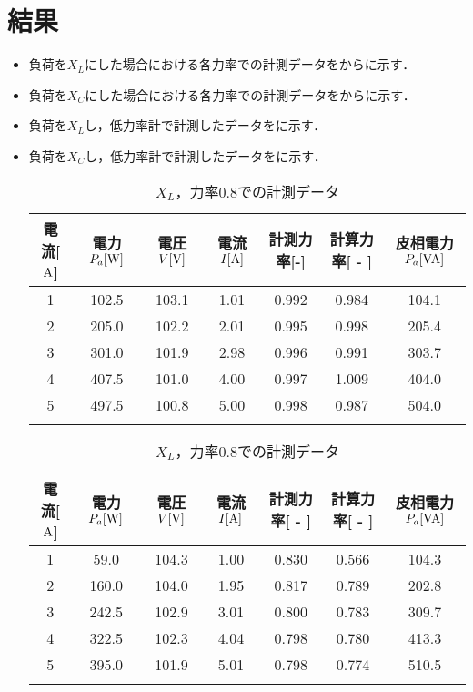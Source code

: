 \clearpage
\section{結果}
\begin{itemize}
	\item 負荷を$X_{L}$にした場合における各力率での計測データをからに示す．
	\item 負荷を$X_{C}$にした場合における各力率での計測データをからに示す．
	\item 負荷を$X_{L}$し，低力率計で計測したデータを\wtab{}に示す．
	\item 負荷を$X_{C}$し，低力率計で計測したデータを\wtab{}に示す．
\begin{table}[h]
	\centering
	\caption{$X_{L}$，力率$1.0$での計測データ}
	\label{tab:1data}
\begin{tabular}{ccccccc}
	\hline
	電流[$\rm{A}$] & 電力$P_a[\rm{W}]$ & 電圧$V[\rm{V}]$ & 電流$I[\rm{A}]$ & 計測力率[\rm{-}]  & 計算力率[ - ]  & 皮相電力$P_a[\rm{VA}]$ \\ \hline
	1      & 102.5   & 103.1   & 1.01  & 0.992 & 0.984 & 104.1   \\
	2      & 205.0   & 102.2   & 2.01  & 0.995 & 0.998 & 205.4   \\
	3      & 301.0   & 101.9   & 2.98  & 0.996 & 0.991 & 303.7   \\
	4      & 407.5   & 101.0   & 4.00  & 0.997 & 1.009 & 404.0   \\
	5      & 497.5   & 100.8   & 5.00  & 0.998 & 0.987 & 504.0     \\ \hline\\
\end{tabular}
	\caption{$X_{L}$，力率$0.8$での計測データ}
	\label{tab:0.8data}
\begin{tabular}{ccccccc}
	\hline
	電流[$\rm{A}$] & 電力$P_a[\rm{W}]$ & 電圧$V[\rm{V}]$ & 電流$I[\rm{A}]$ & 計測力率[ - ] & 計算力率[ - ] & 皮相電力$P_a[\rm{VA}]$ \\ \hline
	1 & 59.0  & 104.3 & 1.00 & 0.830 & 0.566 & 104.3 \\
	2 & 160.0 & 104.0 & 1.95 & 0.817 & 0.789 & 202.8 \\
	3 & 242.5 & 102.9 & 3.01 & 0.800 & 0.783 & 309.7 \\
	4 & 322.5 & 102.3 & 4.04 & 0.798 & 0.780 & 413.3 \\
	5 & 395.0 & 101.9 & 5.01 & 0.798 & 0.774 & 510.5 \\ \hline\\
\end{tabular}

\end{table}
\end{itemize}

